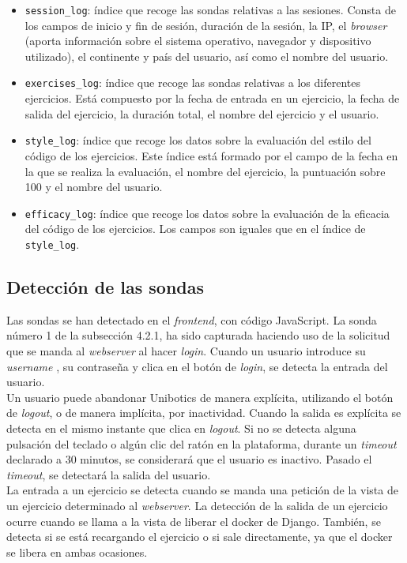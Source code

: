 \begin{itemize}
\item \texttt{session\_log}: índice que recoge las sondas relativas a las sesiones. Consta de los campos de inicio y fin de sesión, duración de la sesión, la IP, el \textit{browser} (aporta información sobre el sistema operativo, navegador y dispositivo utilizado), el continente y país del usuario, así como el nombre del usuario.
\item \texttt{exercises\_log}: índice que recoge las sondas relativas a los diferentes ejercicios. Está compuesto por la fecha de entrada en un ejercicio, la fecha de salida del ejercicio, la duración total, el nombre del ejercicio y el usuario.
\newpage
\item \texttt{style\_log}: índice que recoge los datos sobre la evaluación del estilo del código de los ejercicios. Este índice está formado por el campo de la fecha en la que se realiza la evaluación, el nombre del ejercicio, la puntuación sobre 100 y el nombre del usuario.
\item \texttt{efficacy\_log}: índice que recoge los datos sobre la evaluación de la eficacia del código de los ejercicios. Los campos son iguales que en el índice de \texttt{style\_log}.
\end{itemize}
\subsection{Detección de las sondas}
Las sondas se han detectado en el \textit{frontend}, con código JavaScript. La sonda número 1 de la subsección 4.2.1, ha sido capturada haciendo uso de la solicitud que se manda al \textit{webserver }al hacer \textit{login}. Cuando un usuario introduce su \textit{username }, su contraseña y clica en el botón de \textit{login}, se detecta la entrada del usuario. \\

Un usuario puede abandonar Unibotics de manera explícita, utilizando el botón de \textit{logout}, o de manera implícita, por inactividad. Cuando la salida es explícita se detecta en el mismo instante que clica en \textit{logout}.  Si no se detecta alguna pulsación del teclado o algún clic del ratón en la plataforma, durante un \textit{timeout} declarado a 30 minutos, se considerará que el usuario es inactivo. Pasado el \textit{timeout}, se detectará la salida del usuario.\\

La entrada a un ejercicio se detecta cuando se manda una petición de la vista de un ejercicio determinado al \textit{webserver}. La detección de la salida de un ejercicio ocurre cuando se llama a la vista de liberar el docker de Django. También, se detecta si se está recargando el ejercicio o si sale directamente, ya que el docker se libera en ambas ocasiones.\\

